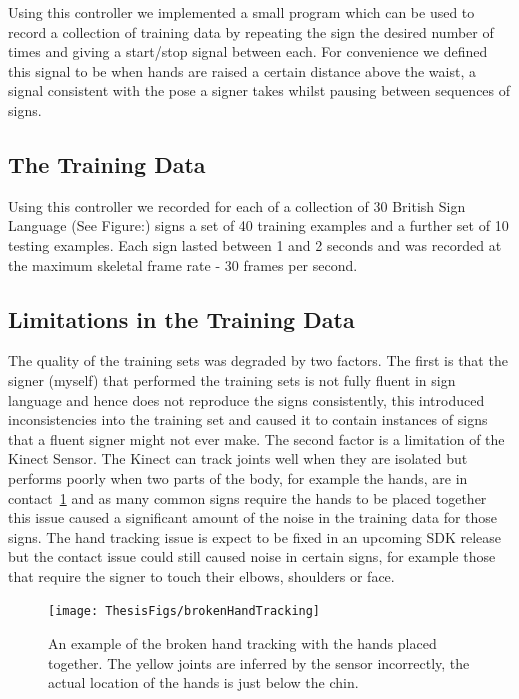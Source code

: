Using this controller we implemented a small program which can be used to record a collection of training data by repeating the sign the desired number of times and giving a start/stop signal between each. For convenience we defined this signal to be when hands are raised a certain distance above the waist, a signal consistent with the pose a signer takes whilst pausing between sequences of signs.
 
\subsection{The Training Data}
Using this controller we recorded for each of a collection of 30 British Sign Language (See Figure:) signs a set of 40 training examples and a further set of 10 testing examples. Each sign lasted between 1 and 2 seconds and was recorded at the maximum skeletal frame rate - 30 frames per second.

\subsection{Limitations in the Training Data}
The quality of the training sets was degraded by two factors. The first is that the signer (myself) that performed the training sets is not fully fluent in sign language and hence does not reproduce the signs consistently, this introduced inconsistencies into the training set and caused it to contain instances of signs that a fluent signer might not ever make. The second factor is a  limitation of the Kinect Sensor. The Kinect can track joints well when they are isolated but performs poorly when two parts of the body, for example the hands, are in contact~\ref{fig:brokht} and as many common signs require the hands to be placed together this issue caused a significant amount of the noise in the training data for those signs. The hand tracking issue is expect to be fixed in an upcoming SDK release but the contact issue could still caused noise in certain signs, for example those that require the signer to touch their elbows, shoulders or face.

\begin{figure}[h!]
        \centering
        \texttt{[image: ThesisFigs/brokenHandTracking]}
        \caption{An example of the broken hand tracking with the hands placed together. The yellow joints are inferred by the sensor incorrectly, the actual location of the hands is just below the chin.}\label{fig:brokht}
\end{figure}



